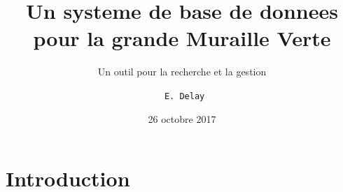 \documentclass[newPxFont]{beamer}
\title{Un systeme de base de donnees pour la grande Muraille Verte}
\subtitle{Un outil pour la recherche et la gestion}
\date{26 octobre 2017}
\author{\texttt{ E. Delay}}
\institute{\textsc{Ohm} Téssékéré - Sénégal}
\begin{document}
%
%

\maketitle


%
%


\section{Introduction}
\end{document}
